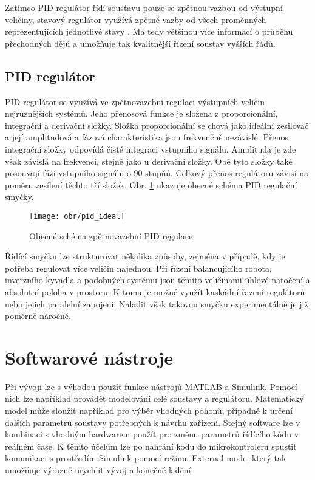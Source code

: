 Zatímco PID regulátor řídí soustavu pouze se zpětnou vazbou od výstupní veličiny, stavový regulátor využívá zpětné vazby od všech proměnných reprezentujících jednotlivé stavy \cite{skalicky}. Má tedy většinou více informací o průběhu přechodných dějů a umožňuje tak kvalitnější řízení soustav vyšších řádů.

\subsection{PID regulátor}
\label{PID}

PID regulátor se využívá ve zpětnovazební regulaci výstupních veličin nejrůznějších systémů. Jeho přenosová funkce je složena z proporcionální, integrační a derivační složky. Složka proporcionální se chová jako ideální zesilovač a její amplitudová a fázová charakteristika jsou frekvenčně nezávislé. Přenos integrační složky odpovídá čisté integraci vstupního signálu. Amplituda je zde však závislá na frekvenci, stejně jako u derivační složky. Obě tyto složky také posouvají fázi vstupního signálu o 90 stupňů. Celkový přenos regulátoru závisí na poměru zesílení těchto tří složek. Obr. \ref{idealpid} ukazuje obecné schéma PID regulační smyčky. 

\begin{figure}[htb]
\begin{center}
\texttt{[image: obr/pid\_ideal]}
\end{center}
\caption{Obecné schéma zpětnovazební PID regulace}
\label{idealpid}
\end{figure}

Řídící smyčku lze strukturovat několika způsoby, zejména v případě, kdy je potřeba regulovat více veličin najednou. Při řízení balancujícího robota, inverzního kyvadla a podobných systému jsou těmito veličinami úhlové natočení a absolutní poloha v prostoru. K tomu je možné využít kaskádní řazení regulátorů nebo jejich paralelní zapojení. Naladit však takovou smyčku experimentálně je již poměrně náročné. 

\section{Softwarové nástroje}
\label{software}

Při vývoji lze s výhodou použít funkce nástrojů MATLAB a Simulink. Pomocí nich lze například provádět modelování celé soustavy a regulátoru. Matematický model může sloužit například pro výběr vhodných pohonů, případně k určení dalších parametrů soustavy potřebných k návrhu zařízení. Stejný software lze v kombinaci s vhodným hardwarem použít pro změnu parametrů řídícího kódu v reálném čase. K těmto účelům lze po nahrání kódu do mikrokontroleru spustit komunikaci s prostředím Simulink pomocí režimu External mode, který tak umožňuje výrazně urychlit vývoj a konečné ladění.

